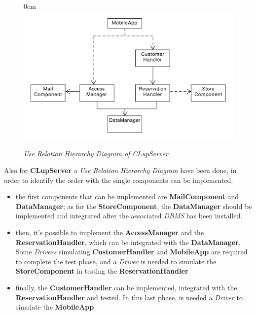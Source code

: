 \documentclass{article}
\begin{document}
		
		\begin{figure}[!h]
			\begin{adjustwidth} {0cm}{}
				\centering
				\includegraphics[scale=0.5]{Hierchical Diagrams/ServerHierarchy.pdf}\\
			\end{adjustwidth}
			\caption{\emph{Use Relation Hierarchy Diagram of CLupServer}}
		\end{figure}	
		
		Also for {\bfseries CLupServer} a \emph{Use Relation Hierarchy Diagram} have been done, in order to identify the order with the single components can be implemented. 
		\begin{itemize}
		\item the first components that can be implemented are {\bfseries MailComponent} and {\bfseries DataManager}; as for the {\bfseries StoreComponent}, the {\bfseries DataManager} should be implemented and integrated after the associated \emph{DBMS} has been installed.
		\item then, it's possible to implement the {\bfseries AccessManager} and the {\bfseries ReservationHandler}, which can be integrated with the {\bfseries DataManager}. Some \emph{Drivers} simulating {\bfseries CustomerHandler} and {\bfseries MobileApp} are required to complete the test phase, and a \emph{Driver} is needed to simulate the {\bfseries StoreComponent} in testing the {\bfseries ReservationHandler}
		\item finally, the {\bfseries CustomerHandler} can be implemented, integrated with the {\bfseries ReservationHandler} and tested. In this last phase, is needed a \emph{Driver} to simulate the {\bfseries MobileApp}
		\end{itemize}
		
\end{document}
